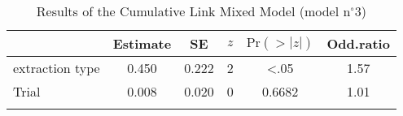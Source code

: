 \begin{table}
\begin{tabular}{l S[table-format=1.3] S[table-format=1.3] S[table-format=1] S[table-format=<1.4] S[table-format=1.2]}
  \lsptoprule
 & {Estimate} & {SE} & {$z$} & {$\text{Pr}(>|z|)$} & {Odd.ratio} \\ 
  \midrule
  extraction type & 0.450 & 0.222 & 2 & <.05 & 1.57 \\ 
  Trial           & 0.008 & 0.020 & 0 & 0.6682 & 1.01 \\ 
   \lspbottomrule
\end{tabular}
\caption{Results of the Cumulative Link Mixed Model (model n$^{\circ}$3)}
\label{tab:exp14-m3}
\end{table}
